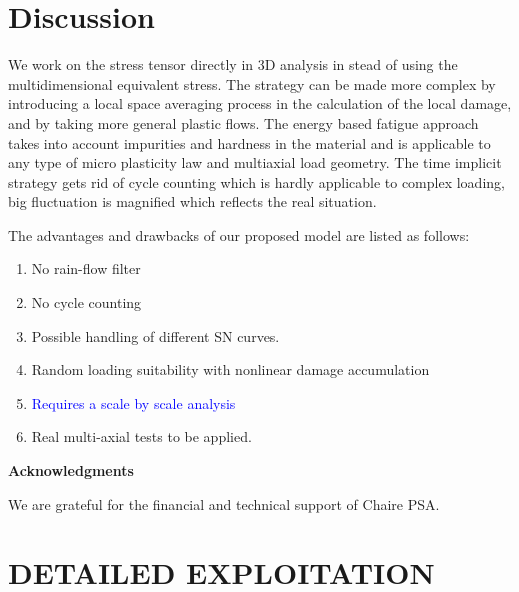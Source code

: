 \documentclass[3p,times,number,review]{elsarticle}
\begin{document}
\clearpage
\section{Discussion}
We work on the stress tensor directly in 3D analysis in stead of using the multidimensional equivalent stress.
The strategy can be made more complex by introducing a local space averaging process in the calculation of the local damage, and by taking more general plastic flows. The energy based fatigue approach takes into account impurities and hardness in the material and is applicable to any type of micro plasticity law and multiaxial load geometry. The time implicit strategy gets rid of cycle counting which is hardly applicable to complex loading, big fluctuation is magnified which reflects the real situation.

The advantages and drawbacks of our proposed model are listed as follows:
\begin{enumerate}
	\vspace{6pt}
	\item No rain-flow filter
	
	\vspace{6pt}
	\item
	No cycle counting
	
	\vspace{6pt}
	\item
	Possible handling of different SN curves.
	
	\vspace{6pt}
	\item
	Random loading suitability with nonlinear damage accumulation
	
	
	\vspace{6pt}
	\item
	{\textcolor{blue} {Requires a scale by scale analysis}}
	
	\vspace{6pt}
	\item
	Real multi-axial tests to be applied.
	
\end{enumerate}

\vspace{6pt}
\noindent
\textbf{Acknowledgments}

\vspace{6pt}
We are grateful for the financial and technical support of Chaire PSA.






\clearpage
\appendix
\appendixpage
{}
	\section{DETAILED EXPLOITATION}
	
	
\end{document}
